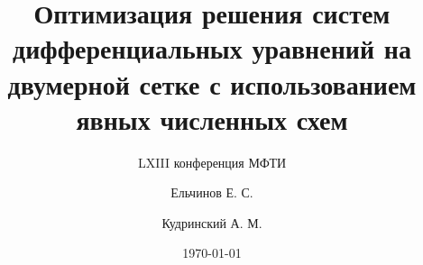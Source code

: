 \documentclass[presentation,18pt]{beamer}
\begin{document}
\title[Оптимизация LRnLA]{Оптимизация решения систем дифференциальных уравнений 
	на двумерной сетке с использованием явных численных схем}
\subtitle{LXIII конференция МФТИ}
\author[Ельчинов]{Ельчинов Е. С. \and
									Кудринский А. М.}
\date{\today}

\begin{frame}
	\label{titular}
	\titlepage
\end{frame}

\end{document}
